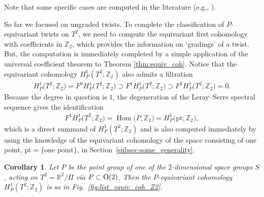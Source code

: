 \documentclass[pdftex]{sigma}
\newtheorem{cor}[thm]{Corollary}
\theoremstyle{definition}
\newcommand{\R}{\mathbb{R}}
\newcommand{\Z}{\mathbb{Z}}
\newcommand{\pt}{\mathrm{pt}}
\begin{document}
Note that some specif\/ic cases are computed in the literature (e.g., \cite{ADG, AGPP, AP}).

So far we focused on ungraded twists. To complete the classif\/ication of $P$-equivariant twists on $T^2$, we need to compute the equivariant f\/irst cohomology with coef\/f\/icients in $\Z_2$, which provides the information on `gradings' of a twist. But, the computation is immediately completed by a simple application of the universal coef\/f\/icient theorem to Theorem \ref{thm:equiv_coh}. Notice that the equivariant cohomology $H^1_P(T^2; \Z_2)$ also admits a f\/iltration
\begin{gather*}
H^1_P\big(T^2; \Z_2\big) = F^0H^1_P\big(T^2; \Z_2\big) \supset F^1H^1_P\big(T^2; \Z_2\big) \supset F^2H^1_P\big(T^2; \Z_2\big) = 0.
\end{gather*}
Because the degree in question is $1$, the degeneration of the Leray--Serre spectral sequence gives the identif\/ication
\begin{gather*}
F^1H^1_P\big(T^2; \Z_2\big) = \operatorname{Hom}\big(P, \Z_2\big) = H^1_P\big(\pt; \Z_2\big),
\end{gather*}
which is a direct summand of $H^1_P(T^2; \Z_2)$ and is also computed immediately by using the knowledge of the equivariant cohomology of the space consisting of one point, $\pt = \{ \mbox{one point} \}$, in Section~\ref{subsec:some_generality}.

\begin{cor} \label{cor:equiv_coh_Z_2}
Let $P$ be the point group of one of the $2$-dimensional space groups $S$, acting on $T^2 = \R^2/\Pi$ via $P \subset {\rm O}(2)$. Then the $P$-equivariant cohomology $H^1_P(T^2; \Z_2)$ is as in Fig.~{\rm \ref{fig:list_equiv_coh_Z2}}.
\end{cor}
\end{document}
